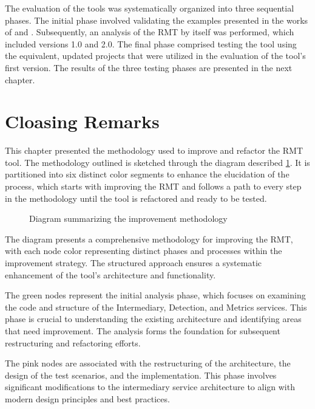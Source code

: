 The evaluation of the tools was systematically organized into three sequential phases. The initial phase involved validating the examples presented in the works of \textcite{liu2014automated} and \cite{zafeiris2017automated}. Subsequently, an analysis of the RMT by itself was performed, which included versions 1.0 and 2.0. The final phase comprised testing the tool using the equivalent, updated projects that were utilized in the evaluation of the tool's first version. The results of the three testing phases are presented in the next chapter.

\section{Cloasing Remarks}

This chapter presented the methodology used to improve and refactor the RMT tool. 
The methodology outlined is sketched through the diagram described \cref{fig-summarized-methodology}. It is partitioned into six distinct color segments to enhance the elucidation of the process, which starts with improving the RMT and follows a path to every step in the methodology until the tool is refactored and ready to be tested.

\begin{figure}[ht!]
\SetCaptionWidth{\textwidth}
\caption{Diagram summarizing the improvement methodology}
\label{fig-summarized-methodology}
\fontsize{3.8}{5}\selectfont

\end{figure}
\FloatBarrier

The diagram presents a comprehensive methodology for improving the RMT, with each node color representing distinct phases and processes within the improvement strategy. The structured approach ensures a systematic enhancement of the tool's architecture and functionality.

The green nodes represent the initial analysis phase, which focuses on examining the code and structure of the Intermediary, Detection, and Metrics services. This phase is crucial to understanding the existing architecture and identifying areas that need improvement. The analysis forms the foundation for subsequent restructuring and refactoring efforts.

The pink nodes are associated with the restructuring of the architecture, the design of the test scenarios, and the implementation. This phase involves significant modifications to the intermediary service architecture to align with modern design principles and best practices. 

